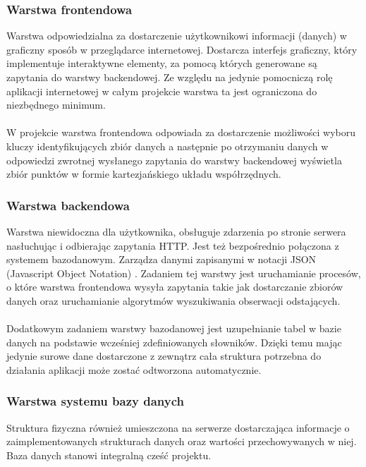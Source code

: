 \documentclass[eng,printmode]{mgr}
\begin{document}
\subsubsection{Warstwa frontendowa}
Warstwa odpowiedzialna za dostarczenie użytkownikowi informacji (danych) w graficzny sposób w przeglądarce internetowej. Dostarcza interfejs graficzny, który implementuje interaktywne elementy, za pomocą których generowane są zapytania do warstwy backendowej. Ze względu na jedynie pomocniczą rolę aplikacji internetowej w całym projekcie warstwa ta jest ograniczona do niezbędnego minimum.
\\\\
W projekcie warstwa frontendowa odpowiada za dostarczenie możliwości wyboru  kluczy identyfikujących zbiór danych a następnie po otrzymaniu danych w odpowiedzi zwrotnej wysłanego zapytania do warstwy backendowej wyświetla zbiór punktów w formie kartezjańskiego układu współrzędnych.
\subsubsection{Warstwa backendowa}
Warstwa niewidoczna dla użytkownika, obsługuje zdarzenia po stronie serwera nasłuchując i odbierając zapytania HTTP. Jest też bezpośrednio połączona z systemem bazodanowym. Zarządza danymi zapisanymi w notacji JSON (Javascript Object Notation) \cite{JSON}. Zadaniem tej warstwy jest uruchamianie procesów, o które warstwa frontendowa wysyła zapytania takie jak dostarczanie zbiorów danych oraz uruchamianie algorytmów wyszukiwania obserwacji odstających.
\\\\
Dodatkowym zadaniem warstwy bazodanowej jest uzupełnianie tabel w bazie danych na podstawie wcześniej zdefiniowanych słowników. Dzięki temu mając jedynie surowe dane dostarczone z zewnątrz cała struktura potrzebna do działania aplikacji może zostać odtworzona automatycznie.
\subsubsection{Warstwa systemu bazy danych}
Struktura fizyczna również umieszczona na serwerze dostarczająca informacje o zaimplementowanych strukturach danych oraz wartości przechowywanych w niej. Baza danych stanowi integralną cześć projektu.
\end{document}

